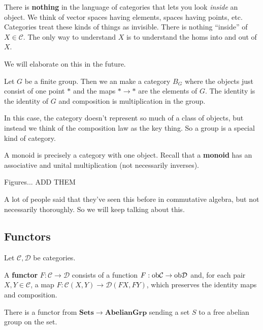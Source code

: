 There is \textbf{nothing} in the language of categories that lets you look
\emph{inside} an object. We think of vector spaces having elements, spaces
having points, etc. Categories treat these kinds of things as invisible. There
is nothing ``inside'' of $X \in \mathcal{C}$. The only way to understand $X$
is to understand the homs into and out of $X$.

We will elaborate on this in the future.

\begin{example} Let $G$ be a finite group. Then we an make a category $B_G$
where the objects just consist of one point $\ast$ and the maps $\ast \to
\ast$ are the elements of $G$. The identity is the identity of $G$ and
composition is multiplication in the group.

In this case, the category doesn't represent so much of a class of objects,
but instead we think of the composition law as the key thing. So a group is a
special kind of category. \end{example}

\begin{example} A monoid is precisely a category with one object. Recall that
a \textbf{monoid} has an associative and unital multiplication (not
necessarily inverses). \end{example}

Figures... ADD THEM

\begin{remark} A lot of people said that they've seen this before in
commutative algebra, but not necessarily thoroughly. So we will keep talking
about this. \end{remark}

\subsection{Functors} Let $\mathcal{C}, \mathcal{D}$ be categories.

\begin{definition} A \textbf{functor} $F: \mathcal{C} \to \mathcal{D}$
consists of a function $F: \mathrm{ob} \mathcal{C} \to \mathrm{ob} \mathcal{D}$ and, for each
pair $X, Y \in \mathcal{C}$, a map $F: \mathcal{C}(X, Y) \to \mathcal{D}(FX,
FY)$, which preserves the identity maps and composition. \end{definition}

\begin{example} There is a functor from $\mathbf{Sets} \to
\mathbf{AbelianGrp}$ sending a set $S$ to a free abelian group on the set.
\end{example}

